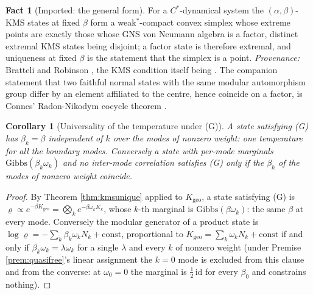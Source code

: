 \documentclass[11pt]{article}
\newtheorem{corollary}[theorem]{Corollary}
\theoremstyle{definition}
\newtheorem{fact}[theorem]{Fact}
\begin{document}
\begin{fact}[Imported: the general form]\label{fact:kmsgeneral}
For a $C^{*}$-dynamical system the $(\alpha,\beta)$-KMS states at fixed $\beta$ form a weak$^{*}$-compact convex simplex whose extreme points are exactly those whose GNS von Neumann algebra is a factor, distinct extremal KMS states being disjoint; a factor state is therefore extremal, and uniqueness at fixed $\beta$ is the statement that the simplex is a point. \emph{Provenance:} Bratteli and Robinson \cite[Thm.~5.3.30]{BR2}, the KMS condition itself being \cite{HHW1967}. The companion statement that two faithful normal states with the same modular automorphism group differ by an element affiliated to the centre, hence coincide on a factor, is Connes' Radon-Nikodym cocycle theorem \cite[Thm.~1.2.1]{Connes1973}.
\end{fact}

\begin{corollary}[Universality of the temperature under (G)]\label{cor:universal}
A state satisfying (G) has $\beta_k = \beta$ independent of $k$ over the modes of nonzero weight: one temperature for all the boundary modes. Conversely a state with per-mode marginals $\mathrm{Gibbs}(\beta_k\omega_k)$ and no inter-mode correlation satisfies (G) only if the $\beta_k$ of the modes of nonzero weight coincide.
\end{corollary}

\begin{proof}
By Theorem \ref{thm:kmsunique} applied to $K_{\mathrm{geo}}$, a state satisfying (G) is $\varrho \propto e^{-\beta K_{\mathrm{geo}}} = \bigotimes_k e^{-\beta\omega_k K_k}$, whose $k$-th marginal is $\mathrm{Gibbs}(\beta\omega_k)$: the same $\beta$ at every mode. Conversely the modular generator of a product state is $\log\varrho = -\sum_k \beta_k\omega_k N_k + \mathrm{const}$, proportional to $K_{\mathrm{geo}} = \sum_k \omega_k N_k + \mathrm{const}$ if and only if $\beta_k\omega_k = \lambda\omega_k$ for a single $\lambda$ and every $k$ of nonzero weight (under Premise \ref{prem:quasifree}'s linear assignment the $k = 0$ mode is excluded from this clause and from the converse: at $\omega_0 = 0$ the marginal is $\tfrac12\,\mathrm{id}$ for every $\beta_0$ and constrains nothing).
\end{proof}
\end{document}
